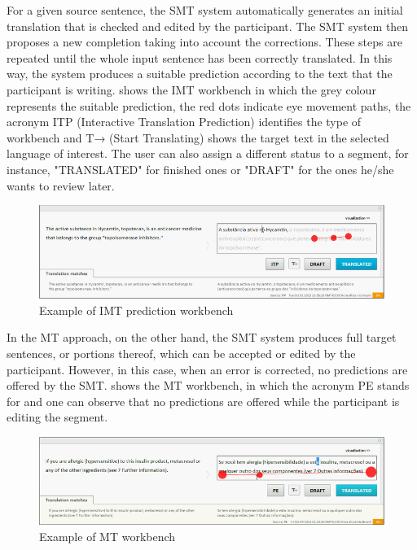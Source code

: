 \documentclass[output=paper]{langsci/langscibook}
\begin{document}
For a given source sentence, the SMT system automatically generates an initial translation that is checked and edited by the participant. The SMT system then proposes a new completion taking into account the corrections. These steps are repeated until the whole input sentence has been correctly translated. In this way, the system produces a suitable prediction according to the text that the participant is writing.  shows the IMT workbench in which the grey colour represents the suitable prediction, the red dots indicate eye movement paths, the acronym ITP (Interactive Translation Prediction) identifies the type of workbench and T→ (Start Translating) shows the target text in the selected language of interest. The user can also assign a different status to a segment, for instance, "TRANSLATED" for finished ones or "DRAFT" for the ones he/she wants to review later.



\begin{figure}
 \includegraphics[width=\textwidth]{figures/Alves2_neu.png}
 \caption{Example of IMT prediction workbench}
 \label{sarto:fig:2}
\end{figure} 


In the MT approach, on the other hand, the SMT system produces full target sentences, or portions thereof, which can be accepted or edited by the participant. However, in this case, when an error is corrected, no predictions are offered by the SMT.  shows the MT workbench, in which the acronym PE stands for  and one can observe that no predictions are offered while the participant is editing the segment.  



  
\begin{figure}
 \includegraphics[width=\textwidth]{figures/Alves3_neu.png}
 \caption{Example of MT workbench}
 \label{sarto:fig:3}
\end{figure} 
 
\end{document}
